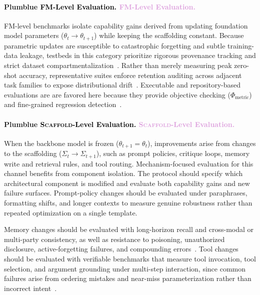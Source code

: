 \documentclass{article}
\let\oldtextcolor\textcolor
\renewcommand{\textcolor}[2]{
  \def\temp{#1}
  \def\red{blue}
  \ifx\temp\red
    \oldtextcolor{black}{#2}
  \else
    \oldtextcolor{#1}{#2}
  \fi
}
\begin{document}
\paragraph{\textcolor{Plum}{\textsc{FM}-Level Evaluation.}} \textsc{FM}-level benchmarks isolate capability gains derived from updating foundation model parameters ($\theta_t \rightarrow \theta_{t+1}$) while keeping the scaffolding constant. Because parametric updates are  susceptible to catastrophic forgetting and subtle training-data leakage, testbeds in this category prioritize rigorous provenance tracking and strict dataset compartmentalization~\citep{aleithan2024swebenchenhancedcodingbenchmark}. Rather than merely measuring peak zero-shot accuracy, representative suites enforce retention auditing across adjacent task families to expose distributional drift~\citep{ruan2024identifyingriskslmagents}. 
Executable and repository-based evaluations are are favored here because they provide objective checking ($\Phi_{\text{metric}}$) and fine-grained regression detection~\citep{ni2025gittaskbenchbenchmarkcodeagents}.


\paragraph{\textcolor{Plum}{\textsc{Scaffold}-Level Evaluation.}}
When the backbone model is frozen ($\theta_{t+1} = \theta_t$), improvements arise from changes to the scaffolding ($\Sigma_t \rightarrow \Sigma_{t+1}$), such as prompt policies, critique loops, memory write and retrieval rules, and tool routing. Mechanism-focused evaluation for this channel benefits from component isolation. The protocol should specify which architectural component is modified and evaluate both capability gains and new failure surfaces. Prompt-policy changes should be evaluated under paraphrases, formatting shifts, and longer contexts to measure genuine robustness rather than repeated optimization on a single template. 

Memory changes should be evaluated with long-horizon recall and cross-modal or multi-party consistency, as well as resistance to poisoning, unauthorized disclosure, active-forgetting failures, and compounding errors~\citep{yang2025drunkagentstealthymemorycorruption, zhu2026h2hmemmultimodalmemorybenchmark, ren2026gatemembenchmarkingmemorygovernance}.
Tool changes should be evaluated with verifiable benchmarks that measure tool invocation, tool selection, and argument grounding under multi-step interaction, since common failures arise from ordering mistakes and near-miss parameterization rather than incorrect intent~\citep{patil2025the, huang2024metatoolbenchmarklargelanguage, shen2024taskbenchbenchmarkinglargelanguage, wang2024mintevaluatingllmsmultiturn}.
\end{document}
